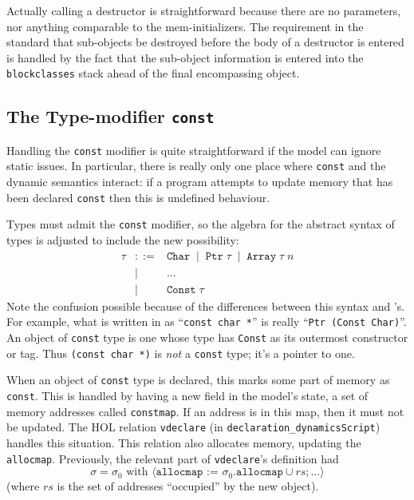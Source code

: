 \documentclass[11pt]{article}
\begin{document}
Actually calling a destructor is straightforward because there are no
parameters, nor anything comparable to the mem-initializers.  The
requirement in the standard that sub-objects be destroyed before the
body of a destructor is entered is handled by the fact that the
sub-object information is entered into the \texttt{blockclasses} stack
ahead of the final encompassing object.



\subsection{The Type-modifier \texttt{const}}
\label{sec:const-type-modifier}

Handling the \texttt{const} modifier is quite straightforward if the
model can ignore static issues.  In particular, there is really only
one place where \texttt{const} and the dynamic semantics interact: if
a program attempts to update memory that has been declared
\texttt{const} then this is undefined behaviour.

Types must admit the \texttt{const} modifier, so the algebra for the
abstract syntax of types is adjusted to include the new possibility:
\[
\begin{array}{lcl}
\tau & ::= & \texttt{Char} \;\;| \;\; \texttt{Ptr}\;\tau\;\;|\;\;\texttt{Array}\;\tau\;n\\
& | & \dots\\
& | & \texttt{Const}\; \tau
\end{array}
\]
Note the confusion possible because of the differences between this
syntax and \cpp's.  For example, what is written in \cpp{} as
``\texttt{const char *}'' is really ``\texttt{Ptr (Const Char)}''.  An
object of \texttt{const} type is one whose type has \texttt{Const} as
its outermost constructor or tag.  Thus \texttt{(const char *)} is
\emph{not} a \texttt{const} type; it's a pointer to one.

When an object of \texttt{const} type is declared, this marks some
part of memory as \texttt{const}.  This is handled by having a new
field in the model's state, a set of memory addresses called
\texttt{constmap}.  If an address is in this map, then it must not be
updated.  The HOL relation \texttt{vdeclare} (in
\texttt{declaration_dynamicsScript}) handles this situation.  This
relation also allocates memory, updating the \texttt{allocmap}.
Previously, the relevant part of \texttt{vdeclare}'s definition had
\[
  \sigma = \sigma_0 \textrm{ with } \langle\texttt{allocmap := }
  \sigma_0.\texttt{allocmap} \cup \mathit{rs}; \dots \rangle
\]
(where $\mathit{rs}$ is the set of addresses ``occupied'' by the new
object).
\end{document}
